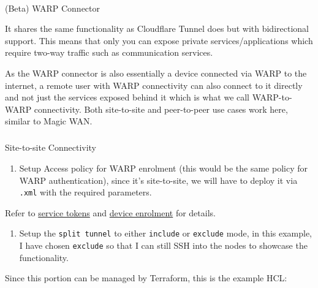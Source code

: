 \documentclass[
]{article}
\makeatletter
\let\oldparagraph\paragraph
\renewcommand{\paragraph}{
    \@ifstar
      \xxxParagraphStar
      \xxxParagraphNoStar
  }
\newcommand{\xxxParagraphStar}[1]{\oldparagraph*{#1}\mbox{}}
\newcommand{\xxxParagraphNoStar}[1]{\oldparagraph{#1}\mbox{}}
\let\oldsubparagraph\subparagraph
\renewcommand{\subparagraph}{
    \@ifstar
      \xxxSubParagraphStar
      \xxxSubParagraphNoStar
  }
\newcommand{\xxxSubParagraphStar}[1]{\oldsubparagraph*{#1}\mbox{}}
\newcommand{\xxxSubParagraphNoStar}[1]{\oldsubparagraph{#1}\mbox{}}
\providecommand{\tightlist}{%
  \setlength{\itemsep}{0pt}\setlength{\parskip}{0pt}}\usepackage{longtable,booktabs,array}
\makeatother
\begin{document}
\newpage{}

\paragraph{(Beta) WARP Connector}\label{beta-warp-connector}

It shares the same functionality as Cloudflare Tunnel does but with
bidirectional support. This means that only you can expose private
services/applications which require two-way traffic such as
communication services.

As the WARP connector is also essentially a device connected via WARP to
the internet, a remote user with WARP connectivity can also connect to
it directly and not just the services exposed behind it which is what we
call WARP-to-WARP connectivity. Both site-to-site and peer-to-peer use
cases work here, similar to Magic WAN.

\subparagraph{Site-to-site
Connectivity}\label{site-to-site-connectivity}

\begin{enumerate}
\def\labelenumi{\arabic{enumi}.}
\tightlist
\item
  Setup Access policy for WARP enrolment (this would be the same policy
  for WARP authentication), since it's site-to-site, we will have to
  deploy it via \texttt{.xml} with the required parameters.
\end{enumerate}

Refer to
\href{https://developers.cloudflare.com/cloudflare-one/identity/service-tokens/}{service
tokens} and
\href{https://developers.cloudflare.com/cloudflare-one/connections/connect-devices/warp/deployment/device-enrollment/}{device
enrolment} for details.

\begin{enumerate}
\def\labelenumi{\arabic{enumi}.}
\setcounter{enumi}{1}
\tightlist
\item
  Setup the \texttt{split\ tunnel} to either \texttt{include} or
  \texttt{exclude} mode, in this example, I have chosen \texttt{exclude}
  so that I can still SSH into the nodes to showcase the functionality.
\end{enumerate}

Since this portion can be managed by Terraform, this is the example HCL:
\end{document}
